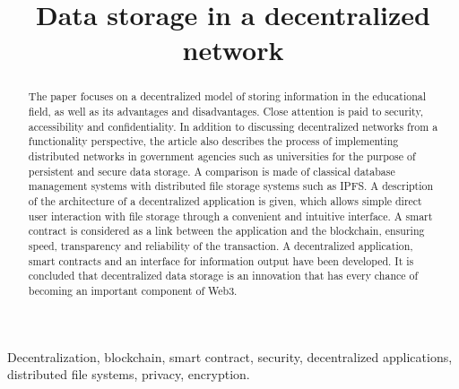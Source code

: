 \documentclass[10pt,conference,a4paper]{IEEEtran_EDM}
\def\confheader{}
\begin{document}
\markboth{\confheader}{}
\title{Data storage in a decentralized network}

\author{
\and
{}
\and
}

\maketitle


\begin{abstract}
The paper focuses on a decentralized model of storing information in the educational field, as well as its advantages and disadvantages.
Close attention is paid to security, accessibility and confidentiality.
In addition to discussing decentralized networks from a functionality perspective, the article also describes the process of implementing distributed networks in government agencies such as universities for the purpose of persistent and secure data storage.
A comparison is made of classical database management systems with distributed file storage systems such as IPFS.
A description of the architecture of a decentralized application is given, which allows simple direct user interaction with file storage through a convenient and intuitive interface.
A smart contract is considered as a link between the application and the blockchain, ensuring speed, transparency and reliability of the transaction.
A decentralized application, smart contracts and an interface for information output have been developed.
It is concluded that decentralized data storage is an innovation that has every chance of becoming an important component of Web3.

\end{abstract}

\begin{IEEEkeywords}
Decentralization, blockchain, smart contract, security, decentralized applications, distributed file systems, privacy, encryption.
\end{IEEEkeywords}
\end{document}
